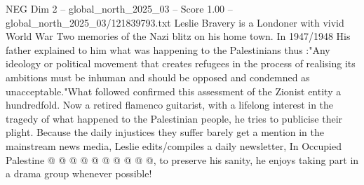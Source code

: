 \begin{textsample}{NEG Dim 2 – global\_north\_2025\_03 – Score 1.00 – global\_north\_2025\_03/121839793.txt}
Leslie Bravery is a Londoner with vivid World War Two memories of the Nazi blitz on his home town.
In 1947/1948 His father explained to him what was happening to the Palestinians thus :"Any ideology or political movement that creates refugees in the process of realising its ambitions must be inhuman and should be opposed and condemned as unacceptable."What followed confirmed this assessment of the Zionist entity a hundredfold.
Now a retired flamenco guitarist, with a lifelong interest in the tragedy of what happened to the Palestinian people, he tries to publicise their plight.
Because the daily injustices they suffer barely get a mention in the mainstream news media, Leslie edits/compiles a daily newsletter, In Occupied Palestine @ @ @ @ @ @ @ @ @ @, to preserve his sanity, he enjoys taking part in a drama group whenever possible!

\end{textsample}
